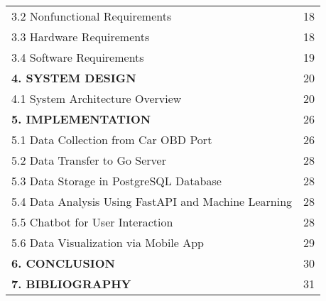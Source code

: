 \begin{tabular}{ll}
    \hspace{0.5cm} 3.2 Nonfunctional Requirements & \hspace{0.8cm}18 \\
    \hspace{0.5cm} 3.3 Hardware Requirements & \hspace{0.8cm}18 \\
    \hspace{0.5cm} 3.4 Software Requirements & \hspace{0.8cm}19 \\[0.5cm]
    \textbf{4. SYSTEM DESIGN} & \hspace{0.8cm}20 \\
    \hspace{0.5cm} 4.1 System Architecture Overview & \hspace{0.8cm}20 \\[0.5cm]
    \textbf{5. IMPLEMENTATION} & \hspace{0.8cm}26 \\
    \hspace{0.5cm} 5.1 Data Collection from Car OBD Port & \hspace{0.8cm}26 \\
    \hspace{0.5cm} 5.2 Data Transfer to Go Server & \hspace{0.8cm}28 \\
    \hspace{0.5cm} 5.3 Data Storage in PostgreSQL Database & \hspace{0.8cm}28 \\
    \hspace{0.5cm} 5.4 Data Analysis Using FastAPI and Machine Learning & \hspace{0.8cm}28 \\
    \hspace{0.5cm} 5.5 Chatbot for User Interaction & \hspace{0.8cm}28 \\
    \hspace{0.5cm} 5.6 Data Visualization via Mobile App & \hspace{0.8cm}29 \\[0.5cm]
    \textbf{6. CONCLUSION} & \hspace{0.8cm}30 \\
    \textbf{7. BIBLIOGRAPHY} & \hspace{0.8cm}31 \\
\end{tabular}

